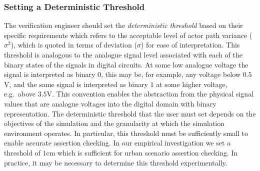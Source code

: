 \documentclass[letterpaper, 10 pt, journal, twoside]{IEEEtran}
\begin{document}
\subsubsection{Setting a Deterministic Threshold} \label{s:threshold}
The verification engineer should set the \textit{deterministic threshold} based on their specific requirements which refers to the acceptable level of actor path variance ($\sigma^2$), which is quoted in terms of deviation ($\sigma$) for ease of interpretation. This threshold is analogous to the analogue signal level associated with each of the binary states of the signals in digital circuits. At some low analogue voltage the signal is interpreted as binary $0$, this may be, for example, any voltage below $0.5$V, and the same signal is interpreted as binary $1$ at some higher voltage, e.g.\ above $3.5$V. This convention enables the abstraction from the physical signal values that are analogue voltages into the digital domain with binary representation. 
%
The deterministic threshold that the user must set depends on the objectives of the simulation and the granularity at which the simulation environment operates. In particular, this threshold must be sufficiently small to enable accurate assertion checking. In our empirical investigation we set a threshold of $1$cm which is sufficient for urban scenario assertion checking. In practice, it may be necessary to determine this threshold experimentally. 




\end{document}
